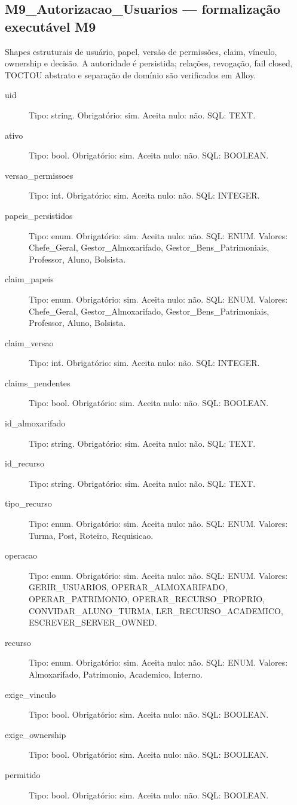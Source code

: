 \subsection*{M9\_Autorizacao\_Usuarios --- formalização executável M9}
Shapes estruturais de usuário, papel, versão de permissões, claim, vínculo, ownership e decisão. A autoridade é persistida; relações, revogação, fail closed, TOCTOU abstrato e separação de domínio são verificados em Alloy.
\begin{description}
\item[uid] Tipo: string. Obrigatório: sim. Aceita nulo: não.
SQL: TEXT.
\item[ativo] Tipo: bool. Obrigatório: sim. Aceita nulo: não.
SQL: BOOLEAN.
\item[versao\_permissoes] Tipo: int. Obrigatório: sim. Aceita nulo: não.
SQL: INTEGER.
\item[papeis\_persistidos] Tipo: enum. Obrigatório: sim. Aceita nulo: não.
SQL: ENUM.
Valores: Chefe\_Geral, Gestor\_Almoxarifado, Gestor\_Bens\_Patrimoniais, Professor, Aluno, Bolsista.
\item[claim\_papeis] Tipo: enum. Obrigatório: sim. Aceita nulo: não.
SQL: ENUM.
Valores: Chefe\_Geral, Gestor\_Almoxarifado, Gestor\_Bens\_Patrimoniais, Professor, Aluno, Bolsista.
\item[claim\_versao] Tipo: int. Obrigatório: sim. Aceita nulo: não.
SQL: INTEGER.
\item[claims\_pendentes] Tipo: bool. Obrigatório: sim. Aceita nulo: não.
SQL: BOOLEAN.
\item[id\_almoxarifado] Tipo: string. Obrigatório: sim. Aceita nulo: não.
SQL: TEXT.
\item[id\_recurso] Tipo: string. Obrigatório: sim. Aceita nulo: não.
SQL: TEXT.
\item[tipo\_recurso] Tipo: enum. Obrigatório: sim. Aceita nulo: não.
SQL: ENUM.
Valores: Turma, Post, Roteiro, Requisicao.
\item[operacao] Tipo: enum. Obrigatório: sim. Aceita nulo: não.
SQL: ENUM.
Valores: GERIR\_USUARIOS, OPERAR\_ALMOXARIFADO, OPERAR\_PATRIMONIO, OPERAR\_RECURSO\_PROPRIO, CONVIDAR\_ALUNO\_TURMA, LER\_RECURSO\_ACADEMICO, ESCREVER\_SERVER\_OWNED.
\item[recurso] Tipo: enum. Obrigatório: sim. Aceita nulo: não.
SQL: ENUM.
Valores: Almoxarifado, Patrimonio, Academico, Interno.
\item[exige\_vinculo] Tipo: bool. Obrigatório: sim. Aceita nulo: não.
SQL: BOOLEAN.
\item[exige\_ownership] Tipo: bool. Obrigatório: sim. Aceita nulo: não.
SQL: BOOLEAN.
\item[permitido] Tipo: bool. Obrigatório: sim. Aceita nulo: não.
SQL: BOOLEAN.
\end{description}
